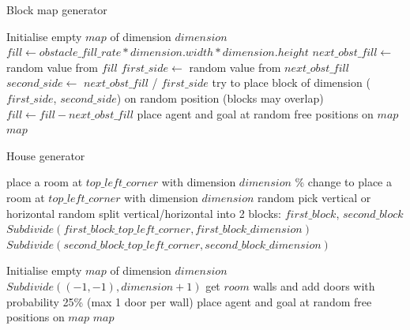 \begin{algorithm}[!htb]
\caption{Block map generator}
\label{alg: Block map generator}
\begin{algorithmic}[1]
    \State Initialise empty $map$ of dimension $dimension$
    \State $fill \gets obstacle\_fill\_rate * dimension.width * dimension.height$
    \State
    \For {$i$ in [0, $nr\_of\_obstacles$)}
        \State $next\_obst\_fill \gets$ random value from $fill$
            \State $first\_side \gets$ random value from $next\_obst\_fill$
            \State $second\_side \gets$ $next\_obst\_fill$ / $first\_side$
            \State try to place block of dimension ($first\_side$, $second\_side$) on random position (blocks may overlap)
        \EndWhile
        \State 
        \State $fill \gets fill - next\_obst\_fill$
    \EndFor
    \State
    \State place agent and goal at random free positions on $map$
    \State \Return $map$
\EndProcedure
\end{algorithmic}
\end{algorithm}

\begin{algorithm}[!htb]
\caption{House generator}
\label{alg: House generator}
\begin{algorithmic}[1]

        \State place a room at $top\_left\_corner$ with dimension $dimension$
    \EndIf
    \State
        \% change to place a room at $top\_left\_corner$ with dimension $dimension$
    \EndIf
    \State
    \State random pick vertical or horizontal
    \State random split vertical/horizontal into 2 blocks: $first\_block$, $second\_block$
    \State
    \State $\textit{Subdivide}(first\_block\_top\_left\_corner, first\_block\_dimension)$
    \State $\textit{Subdivide}(second\_block\_top\_left\_corner, second\_block\_dimension)$
\EndProcedure

    \State Initialise empty $map$ of dimension $dimension$
    \State
    \State $\textit{Subdivide}((-1, -1), dimension + 1)$
        \State get $room$ walls and add doors with probability 25\% (max 1 door per wall)
    \EndFor
    \State
    \State place agent and goal at random free positions on $map$
    \State \Return $map$
\EndProcedure
\end{algorithmic}
\end{algorithm}

